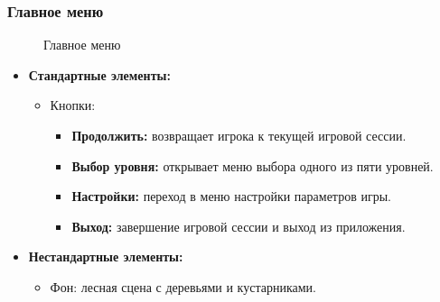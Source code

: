 \documentclass{article}
\begin{document}
\subsubsection{Главное меню}
\begin{figure}[h]
            \caption{Главное меню}
            \label{ris:image}
            \end{figure}

\begin{itemize}
    \item \textbf{Стандартные элементы:}
    \begin{itemize}
        \item Кнопки:
        \begin{itemize}
            \item \textbf{Продолжить:} возвращает игрока к текущей игровой сессии.
            \item \textbf{Выбор уровня:} открывает меню выбора одного из пяти уровней.
            \item \textbf{Настройки:} переход в меню настройки параметров игры.
            \item \textbf{Выход:} завершение игровой сессии и выход из приложения.
        \end{itemize}
    \end{itemize}
    \item \textbf{Нестандартные элементы:}
    \begin{itemize}
        \item Фон: лесная сцена с деревьями и кустарниками.
    \end{itemize}
\end{itemize}
\end{document}
